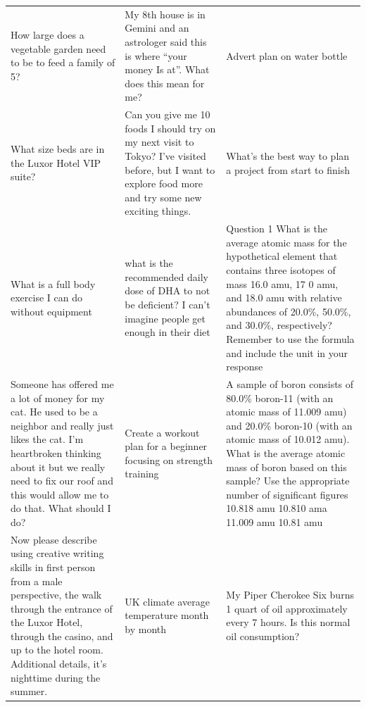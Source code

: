 \begin{table}[ht]
\begin{tabular}{p{4.3cm}p{4.3cm}p{4.3cm}}
How large does a vegetable garden need to be to feed a family of 5? & My 8th house is in Gemini and an astrologer said this is where “your money Is at”. What does this mean for me? & Advert plan on water bottle \\[4pt]
What size beds are in the Luxor Hotel VIP suite? & Can you give me 10 foods I should try on my next visit to Tokyo? I've visited before, but I want to explore food more and try some new exciting things. & What’s the best way to plan a project from start to finish \\[4pt]
What is a full body exercise I can do without equipment & what is the recommended daily dose of DHA to not be deficient? I can't imagine people get enough in their diet & Question 1  What is the average atomic mass for the hypothetical element that contains three isotopes of mass 16.0 amu, 17 0 amu, and 18.0 amu with relative abundances of 20.0\%, 50.0\%, and 30.0\%, respectively? Remember to use the formula and include the unit in your response \\[4pt]
Someone has offered me a lot of money for my cat.  He used to be a neighbor and really just likes the cat.  I'm heartbroken thinking about it but we really need to fix our roof and this would allow me to do that. What should I do? & Create a workout plan for a beginner focusing on strength training & A sample of boron consists of 80.0\% boron-11 (with an atomic mass of 11.009 amu) and 20.0\% boron-10 (with an atomic mass of 10.012 amu). What is the average atomic mass of boron based on this sample?  Use the appropriate number of significant figures  10.818 amu  10.810 ama  11.009 amu  10.81 amu \\[4pt]
Now please describe using creative writing skills in first person from a male perspective, the walk through the entrance of the Luxor Hotel, through the casino, and up to the hotel room.   Additional details, it's nighttime during the summer. & UK climate average temperature month by month & My Piper Cherokee Six burns 1 quart of oil approximately every 7 hours. Is this normal oil consumption? \\[4pt]

\end{tabular}
\end{table}
